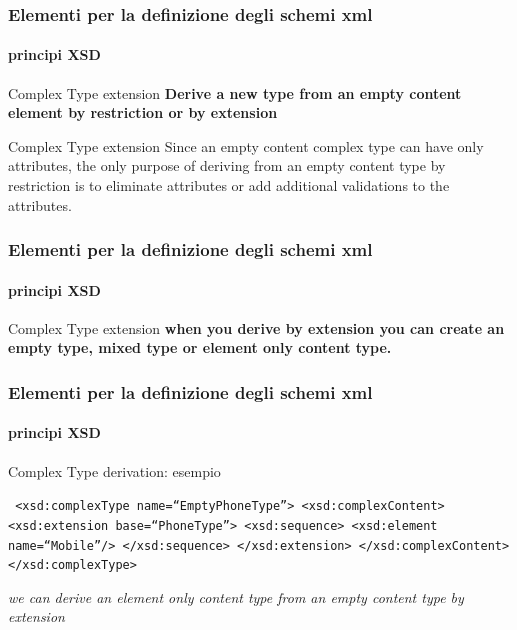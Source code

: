\begin{frame}
	\frametitle{Elementi per la definizione degli schemi xml}
	\framesubtitle{principi XSD}
	\addtocounter{nframe}{1}

	\begin{block}{Complex Type extension}
		\textbf{Derive a new type from an empty content element by restriction or by extension}
	\end{block}

	\begin{block}{Complex Type extension}
		Since an empty content complex type can have only attributes, the only purpose of deriving from an empty content type by restriction is to eliminate attributes or add additional validations to the attributes.
	\end{block}
\end{frame}





\begin{frame}
	\frametitle{Elementi per la definizione degli schemi xml}
	\framesubtitle{principi XSD}
	\addtocounter{nframe}{1}

	\begin{block}{Complex Type extension}
		\textbf{ when you derive by extension you can create an empty type, mixed type or element only content type.}
	\end{block}

\end{frame}


\begin{frame}
	\frametitle{Elementi per la definizione degli schemi xml}
	\framesubtitle{principi XSD}
	\addtocounter{nframe}{1}

	\begin{block}{Complex Type derivation: esempio}

		\texttt{
			<xsd:complexType name=``EmptyPhoneType''>
			<xsd:complexContent>
			<xsd:extension base=``PhoneType''>
			<xsd:sequence>
			<xsd:element name=``Mobile''/>
			</xsd:sequence>
			</xsd:extension>
			</xsd:complexContent>
			</xsd:complexType>
		}
	\end{block}
	\textit{we can derive an element only content type from an empty content type by extension}
\end{frame}


